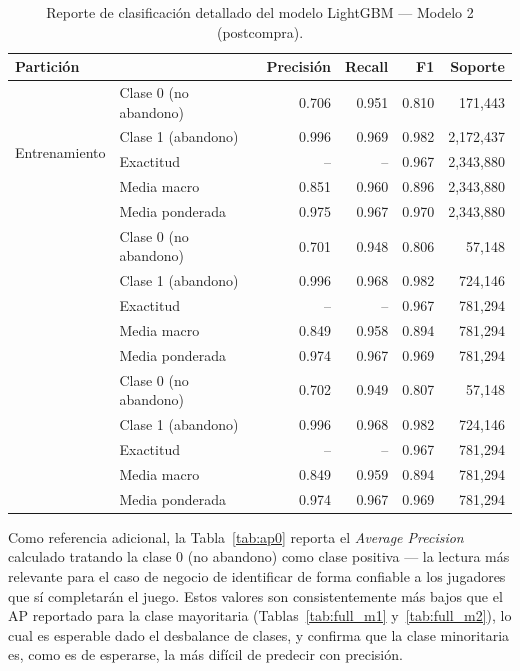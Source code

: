 \documentclass[11pt,letterpaper]{article}
\begin{document}
\begin{table}[h!]
\centering
\footnotesize
\caption{Reporte de clasificación detallado del modelo LightGBM --- Modelo 2 (postcompra).}
\label{tab:cr_m2}
\begin{tabular}{@{}llrrrr@{}}
\toprule
Partición & & Precisión & Recall & F1 & Soporte \\
\midrule
\multirow{5}{*}{Entrenamiento}
  & Clase 0 (no abandono) & 0.706 & 0.951 & 0.810 & 171{,}443 \\
  & Clase 1 (abandono)    & 0.996 & 0.969 & 0.982 & 2{,}172{,}437 \\
  & Exactitud             & --    & --    & 0.967 & 2{,}343{,}880 \\
  & Media macro           & 0.851 & 0.960 & 0.896 & 2{,}343{,}880 \\
  & Media ponderada       & 0.975 & 0.967 & 0.970 & 2{,}343{,}880 \\
\addlinespace
\multirow{5}{*}{Validación}
  & Clase 0 (no abandono) & 0.701 & 0.948 & 0.806 & 57{,}148 \\
  & Clase 1 (abandono)    & 0.996 & 0.968 & 0.982 & 724{,}146 \\
  & Exactitud             & --    & --    & 0.967 & 781{,}294 \\
  & Media macro           & 0.849 & 0.958 & 0.894 & 781{,}294 \\
  & Media ponderada       & 0.974 & 0.967 & 0.969 & 781{,}294 \\
\addlinespace
\multirow{5}{*}{Prueba}
  & Clase 0 (no abandono) & 0.702 & 0.949 & 0.807 & 57{,}148 \\
  & Clase 1 (abandono)    & 0.996 & 0.968 & 0.982 & 724{,}146 \\
  & Exactitud             & --    & --    & 0.967 & 781{,}294 \\
  & Media macro           & 0.849 & 0.959 & 0.894 & 781{,}294 \\
  & Media ponderada       & 0.974 & 0.967 & 0.969 & 781{,}294 \\
\bottomrule
\end{tabular}
\end{table}

Como referencia adicional, la Tabla~\ref{tab:ap0} reporta el \textit{Average Precision} calculado tratando la clase 0 (no abandono) como clase positiva --- la lectura más relevante para el caso de negocio de identificar de forma confiable a los jugadores que sí completarán el juego. Estos valores son consistentemente más bajos que el AP reportado para la clase mayoritaria (Tablas~\ref{tab:full_m1} y~\ref{tab:full_m2}), lo cual es esperable dado el desbalance de clases, y confirma que la clase minoritaria es, como es de esperarse, la más difícil de predecir con precisión.
\end{document}
